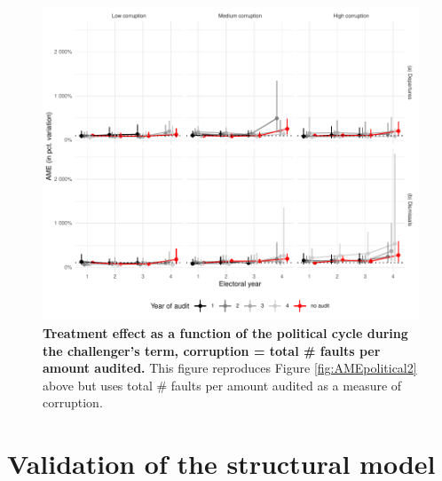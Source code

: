 \documentclass[12pt,a4paper]{article}
\theoremstyle{definition}
\begin{document}
{\begin{figure}[H]
   \centering
   \includegraphics{figures/AMEpoliticalSeriousPerAmount_term2Client.pdf}
   \caption{{\bf Treatment effect as a function of the political cycle during the challenger's term, corruption = total \# faults per amount audited.} This figure reproduces Figure \ref{fig:AMEpolitical2} above but uses total \# faults per amount audited as a measure of corruption.}
   \label{fig:AMEpolitical2_seriousPerAmount}
\end{figure}

\section{Validation of the structural model}
\label{app:structural}

}
\end{document}
